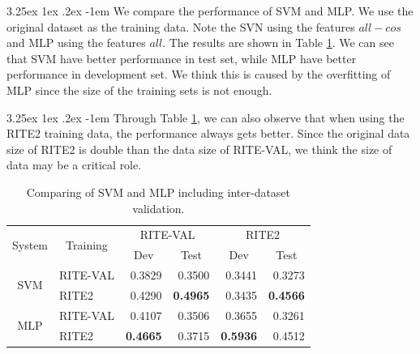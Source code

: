 \documentclass[12pt]{article}
\makeatletter
\renewcommand\paragraph{\@startsection{paragraph}{5}{\z@}%
  {3.25ex \@plus1ex \@minus.2ex}%
  {-1em}%
  {\normalfont\normalsize\bfseries}}
\makeatother
\begin{document}
\begin{CJK*}{UTF8}{bkai}
\begin{spacing}{1.77}
\paragraph{}
We compare the performance of SVM and MLP. We use the original dataset as the training data. Note the SVN using the features $all-cos$ and MLP using the features $all$. The results are shown in Table \ref{result:ml_original}. We can see that SVM have better performance in test set, while MLP have better performance in development set. We think this is caused by the overfitting of MLP since the size of the training sets is not enough.

\paragraph{}
Through Table \ref{result:ml_original}, we can also observe that when using the RITE2 training data, the performance always gets better. Since the original data size of RITE2 is double than the data size of RITE-VAL, we think the size of data may be a critical role.

\begin{table}[H]
  \centering
  \setlength{\extrarowheight}{-3pt}
  \caption{Comparing of SVM and MLP including inter-dataset validation.}
  \label{result:ml_original}
  \begin{tabular}{|c|l|r|r|r|r|}
  \hline
  \multirow{2}{*}{System} & \multicolumn{1}{c|}{\multirow{2}{*}{Training}} & \multicolumn{2}{c|}{RITE-VAL} & \multicolumn{2}{c|}{RITE2} \\ \cline{3-6}
   & \multicolumn{1}{c|}{} & \multicolumn{1}{c|}{Dev} & \multicolumn{1}{c|}{Test} & \multicolumn{1}{c|}{Dev} & \multicolumn{1}{c|}{Test} \\ \hline
  \multirow{2}{*}{SVM} & RITE-VAL & 0.3829 & 0.3500 & 0.3441 & 0.3273 \\ \cline{2-6}
   & RITE2 & 0.4290 & \textbf{0.4965} & 0.3435 & \textbf{0.4566} \\ \hline
  \multirow{2}{*}{MLP} & RITE-VAL & 0.4107 & 0.3506 & 0.3655 & 0.3261 \\ \cline{2-6}
   & RITE2 & \textbf{0.4665} & 0.3715 & \textbf{0.5936} & 0.4512 \\ \hline
  \end{tabular}
\end{table}


\end{spacing}
\end{CJK*}
\end{document}
